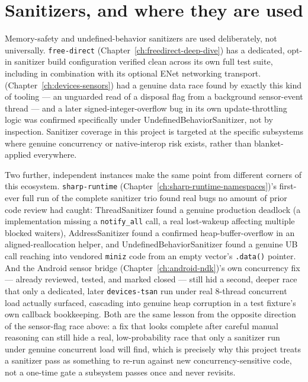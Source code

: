 \section{Sanitizers, and where they are used}

Memory-safety and undefined-behavior sanitizers are used deliberately, not universally.
\texttt{free-direct} (Chapter~\ref{ch:freedirect-deep-dive}) has a dedicated, opt-in sanitizer
build configuration verified clean across its own full test suite, including in combination
with its optional ENet networking transport. 
(Chapter~\ref{ch:devices-sensors}) had a genuine data race found by exactly this kind of
tooling --- an unguarded read of a disposal flag from a background sensor-event thread --- and
a later signed-integer-overflow bug in its own update-throttling logic was confirmed
specifically under UndefinedBehaviorSanitizer, not by inspection. Sanitizer coverage in this
project is targeted at the specific subsystems where genuine concurrency or native-interop
risk exists, rather than blanket-applied everywhere.

Two further, independent instances make the same point from different corners of this
ecosystem. \texttt{sharp-runtime} (Chapter~\ref{ch:sharp-runtime-namespaces})'s first-ever full
run of the complete sanitizer trio found real bugs no amount of prior code review had caught:
ThreadSanitizer found a genuine production deadlock (a  implementation
missing a \texttt{notify\_all} call, a real lost-wakeup affecting multiple blocked waiters),
AddressSanitizer found a confirmed heap-buffer-overflow in an aligned-reallocation helper, and
UndefinedBehaviorSanitizer found a genuine UB call reaching into vendored \texttt{miniz} code
from an empty vector's \texttt{.data()} pointer. And the Android sensor bridge
(Chapter~\ref{ch:android-ndk})'s own concurrency fix --- already reviewed, tested, and marked
closed --- still hid a second, deeper race that only a dedicated, later \texttt{devices-tsan}
run under real 8-thread concurrent load actually surfaced, cascading into genuine heap
corruption in a test fixture's own callback bookkeeping. Both are the same lesson from the
opposite direction of the sensor-flag race above: a fix that looks complete after careful
manual reasoning can still hide a real, low-probability race that only a sanitizer run under
genuine concurrent load will find, which is precisely why this project treats a sanitizer pass
as something to re-run against new concurrency-sensitive code, not a one-time gate a subsystem
passes once and never revisits.

